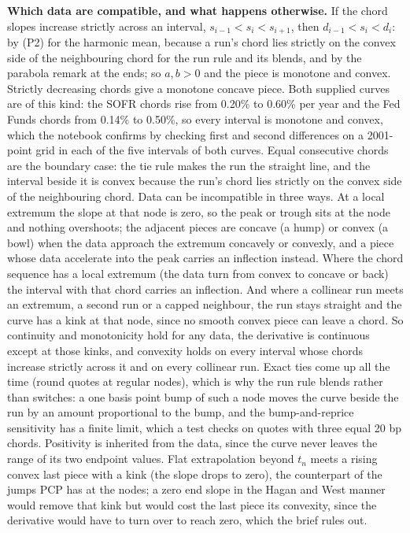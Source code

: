 \documentclass[10pt]{article}
\begin{document}
\textbf{Which data are compatible, and what happens otherwise.} If the chord slopes increase strictly across an interval,
$s_{i-1}<s_i<s_{i+1}$, then $d_{i-1}<s_i<d_i$: by (P2) for the harmonic mean, because a run's chord lies strictly on the convex side of
the neighbouring chord for the run rule and its blends, and by the parabola remark at the ends; so $a,b>0$ and the piece is monotone
and convex. Strictly decreasing chords give a monotone concave piece. Both supplied curves are of this kind: the SOFR chords rise from
0.20\% to 0.60\% per year and the Fed Funds chords from 0.14\% to 0.50\%, so every interval is monotone and convex,
which the notebook confirms by checking first and second differences on a 2001-point grid in each of the five intervals of both curves.
Equal consecutive chords are the boundary case: the tie rule makes the run the straight line, and the interval beside it is convex
because the run's chord lies strictly on the convex side of the neighbouring chord. Data can be incompatible in three ways. At a local
extremum the slope at that node is zero, so the peak or trough sits at the node and nothing overshoots; the adjacent pieces are concave
(a hump) or convex (a bowl) when the data approach the extremum concavely or convexly, and a piece whose data accelerate into the peak
carries an inflection instead. Where the chord sequence has a local extremum (the data turn from convex to concave or back) the interval with that chord carries an inflection. And where a collinear run meets an extremum, a second run or a capped neighbour, the run stays straight and the curve has
a kink at that node, since no smooth convex piece can leave a chord. So continuity and monotonicity hold for any data, the derivative
is continuous except at those kinks, and convexity holds on every interval whose chords increase strictly across it and on every
collinear run. Exact ties come up all the time (round quotes at regular nodes), which is why the run rule blends rather than switches: a one basis
point bump of such a node moves the curve beside the run by an amount proportional to the bump, and the bump-and-reprice sensitivity
has a finite limit, which a test checks on quotes with three equal 20 bp chords. Positivity is inherited
from the data, since the curve never leaves the range of its two endpoint values. Flat extrapolation beyond $t_n$ meets a rising
convex last piece with a kink (the slope drops to zero), the counterpart of the jumps PCP has at the nodes; a zero end slope in the
Hagan and West manner would remove that kink but would cost the last piece its convexity, since the derivative would have to turn
over to reach zero, which the brief rules out.
\end{document}
